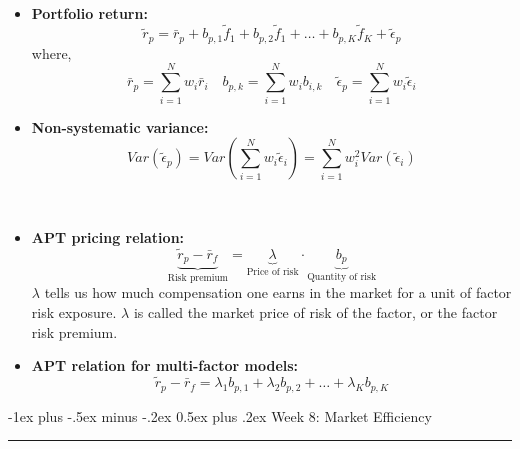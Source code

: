 \documentclass[10pt,landscape,a4paper]{article}
\makeatletter
\renewcommand{\section}{\@startsection{section}{1}{0mm}%
                                {-1ex plus -.5ex minus -.2ex}%
                                {0.5ex plus .2ex}%
                                {\normalfont\large\bfseries}}
\makeatother
\begin{document}
\begin{multicols*}{3}
\begin{description}[itemsep=0pt]
\begin{itemize}
	\end{itemize}
\end{description}

\begin{description}[itemsep=0pt]
	\item[Portfolio return]  ~
	\begin{itemize}
		\item {\bf Portfolio return:} $$ \tilde{r}_p = \bar{r}_p +  b_{p,1} \tilde{f}_1 + b_{p,2} \tilde{f}_1 + \dots + b_{p,K} \tilde{f}_K  +\tilde{\epsilon}_p $$
		where, 
		$$ \bar{r}_p = \sum_{i=1}^{N}{w_i \bar{r}_i}  \quad   b_{p,k}=\sum_{i=1}^{N}{w_i b_{i,k}} \quad  \tilde{\epsilon}_p = \sum_{i=1}^{N}{w_i \tilde{\epsilon}_i}$$
		\item {\bf Non-systematic variance:} $$ Var( \tilde{\epsilon}_p) = Var \left( \sum_{i=1}^{N}{w_i \tilde{\epsilon}_i}  \right) = \sum_{i=1}^{N}{w_i ^2 Var (\tilde{\epsilon}_i)} $$
		
	\end{itemize}
\end{description}


\begin{description}[itemsep=0pt]
	\item[Expected Returns on Diversified Portfolios]  ~
	\begin{itemize}
		\item {\bf APT pricing relation:} $$ \underbrace{\tilde{r}_p - \bar{r}_f}_{\text{Risk premium}} =  \underbrace{\lambda}_{\text{Price of risk}} \cdot \underbrace{b_p}_{\text{Quantity of risk}} $$ $\lambda$ tells us how much compensation one earns in the market for a unit of
		factor risk exposure. $\lambda$ is called the market price of risk of the factor, or the factor risk premium.
	   \item {\bf APT relation for multi-factor models:} $$ \tilde{r}_p - \bar{r}_f = \lambda_1 b_{p,1} + \lambda_2 b_{p,2} + \dots + \lambda_K b_{p,K} $$
		
	\end{itemize}
\end{description}




\section{Week 8: Market Efficiency}\smallskip \hrule height 1pt \smallskip


\end{multicols*}
\end{document}

